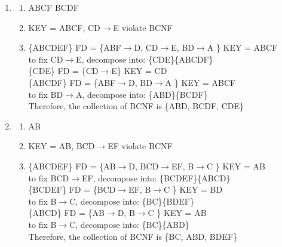 \documentclass[11pt, a4paper]{article}
\begin{document}
\begin{enumerate}
    \item    
        \begin{enumerate}
            \item 
                ABCF
                BCDF
            \item
                KEY = ABCF, CD$\to$E violate BCNF
            \item 
                \{ABCDEF\} FD = \{ABF$\to$D, CD$\to$E, BD$\to$A \} KEY = ABCF\\
                to fix CD$\to$E, decompose into: \{CDE\}\{ABCDF\}\\
                \{CDE\} FD = \{CD$\to$E\} KEY = CD\\
                \{ABCDF\} FD = \{ABF$\to$D, BD$\to$A \} KEY = ABCF\\
                to fix BD$\to$A, decompose into: \{ABD\}\{BCDF\}\\
                Therefore, the collection of BCNF is \{ABD, BCDF, CDE\}                
        \end{enumerate}

    \item    
        \begin{enumerate}
            \item 
                AB
            \item
                KEY = AB, BCD$\to$EF violate BCNF
            \item 
                \{ABCDEF\} FD = \{AB$\to$D, BCD$\to$EF, B$\to$C \} KEY = AB\\
                to fix BCD$\to$EF, decompose into: \{BCDEF\}\{ABCD\}\\
                \{BCDEF\} FD = \{BCD$\to$EF, B$\to$C \} KEY = BD\\
                to fix B$\to$C, decompose into: \{BC\}\{BDEF\}\\
                \{ABCD\} FD = \{AB$\to$D, B$\to$C \} KEY = AB\\
                to fix B$\to$C, decompose into: \{BC\}\{ABD\}\\
                Therefore, the collection of BCNF is \{BC, ABD, BDEF\}                   
        \end{enumerate}
\end{enumerate}
\end{document}
